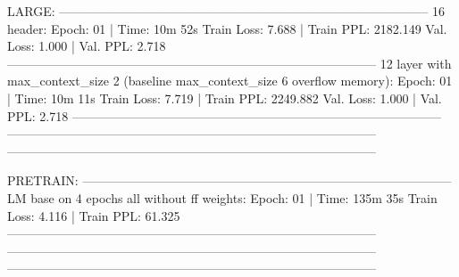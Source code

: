 \documentclass[letterpaper]{article} %
\begin{document}
\begin{CJK*}{UTF8}{gbsn}
LARGE:
-----------------------------------------------------------------------------------------
16 header:
Epoch: 01 | Time: 10m 52s
	Train Loss: 7.688 | Train PPL: 2182.149
	 Val. Loss: 1.000 |  Val. PPL:   2.718
-----------------------------------------------------------------------------------------
12 layer with max_context_size 2 (baseline max_context_size 6 overflow memory):
Epoch: 01 | Time: 10m 11s
	Train Loss: 7.719 | Train PPL: 2249.882
	 Val. Loss: 1.000 |  Val. PPL:   2.718
-----------------------------------------------------------------------------------------
-----------------------------------------------------------------------------------------
-----------------------------------------------------------------------------------------

PRETRAIN:
-----------------------------------------------------------------------------------------
LM base on 4 epochs all without ff weights:
Epoch: 01 | Time: 135m 35s
	Train Loss: 4.116 | Train PPL:  61.325
-----------------------------------------------------------------------------------------
-----------------------------------------------------------------------------------------
-----------------------------------------------------------------------------------------



\end{CJK*}
\end{document}
